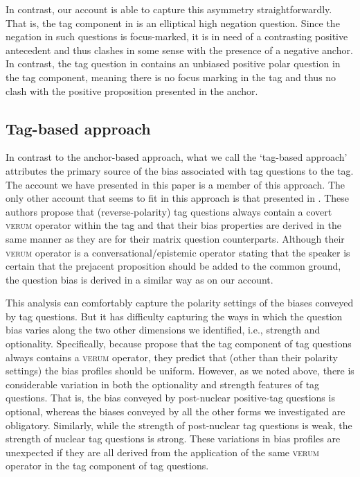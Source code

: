 \documentclass[output=paper,colorlinks,citecolor=brown]{langscibook}
\begin{document}
In contrast, our account is able to capture this asymmetry straightforwardly. That is, the tag component in  is an elliptical high negation question. Since the negation in such questions is focus-marked, it is in need of a contrasting positive antecedent and thus clashes in some sense with the presence of a negative anchor. In contrast, the tag question in  contains an unbiased positive polar question in the tag component, meaning there is no focus marking in the tag and thus no clash with the positive proposition presented in the anchor.  

\subsection{Tag-based approach}
In contrast to the anchor-based approach, what we call the `tag-based approach' attributes the primary source of the bias associated with tag questions to the tag. The account we have presented in this paper is a member of this approach. The only other account that seems to fit in this approach is that presented in \citet{romero2004}. These authors propose that (reverse-polarity) tag questions always contain a covert \textsc{verum} operator within the tag and that their bias properties are derived in the same manner as they are for their matrix question counterparts. Although their \textsc{verum} operator is a conversational/epistemic operator stating that the speaker is certain that the prejacent proposition should be added to the common ground, the question bias is derived in a similar way as on our account.   

This analysis can comfortably capture the polarity settings of the biases conveyed by tag questions. But it has difficulty capturing the ways in which the question bias varies along the two other dimensions we identified, i.e., strength and optionality. Specifically, because \citet{romero2004} propose that the tag component of tag questions always contains a \textsc{verum} operator, they predict that (other than their polarity settings) the bias profiles should be uniform. However, as we noted above, there is considerable variation in both the optionality and strength features of tag questions. That is, the bias conveyed by post-nuclear positive-tag questions is optional, whereas the biases conveyed by all the other forms we investigated are obligatory. Similarly, while the strength of post-nuclear tag questions is weak, the strength of nuclear tag questions is strong. These variations in bias profiles are unexpected if they are all derived from the application of the same \textsc{verum} operator in the tag component of tag questions. 
\end{document}
